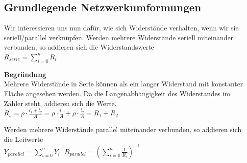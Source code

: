 \newpage

					\subsection{Grundlegende Netzwerkumformungen}
					Wir interessieren uns nun dafür, wie sich Widerstände verhalten, wenn wir sie seriell/parallel verknüpfen.
					\beginip
					Werden mehrere Widerstände seriell miteinander verbunden, so addieren sich die Widerstandswerte \\
					\formulaBegin
					$\displaystyle R_{serie} = \sum_{i=0}^n R_i $
					\formulaEnd
					\iend

		        \vspace{1em}

					\textbf{Begründung} \\
					Mehrere Widerstände in Serie können als ein langer Widerstand mit konstanter Fläche angesehen werden. Da die Längenabhängigkeit des Widerstandes im Zähler steht, addieren sich die Werte. \\
					$\displaystyle R_s = \rho \cdot \frac{l_1+l_2}{A} = \rho \cdot \frac{l_1}{A}  + \rho \cdot \frac{l_2}{A}  = R_1 + R_2 $
					\fix
					\begin{center}
					\end{center}
\fix



					\beginip
					Werden mehrere Widerstände parallel miteinander verbunden, so addieren sich die Leitwerte \\
					\formulaBegin
					$\displaystyle Y_{parallel} = \sum_{i=0}^n Y_i \Bigg\rvert$
					$\displaystyle R_{parallel} = \left(\sum_{i=0}^n \frac{1}{R_i}\right)^{-1}$
					\formulaEnd
					\iend


